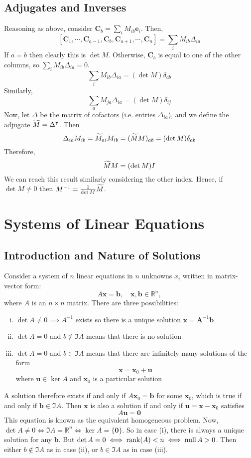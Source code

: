 \documentclass{article}
\begin{document}
\subsection{Adjugates and Inverses}
Reasoning as above, consider $\bm C_b = \sum_i M_{ib} \bm e_i$. Then,
\[ [\bm C_1, \cdots, \bm C_{a-1}, \bm C_b, \bm C_{a+1}, \cdots, \bm C_n ] = \sum_i M_{ib} \Delta_{ia} \]
If $a=b$ then clearly this is $\det M$. Otherwise, $\bm C_b$ is equal to one of the other columns, so $\sum_i M_{ib} \Delta_{ia} = 0$.
\[ \sum_i M_{ib} \Delta_{ia} = (\det M)\delta_{ab} \]
Similarly,
\[ \sum_a M_{ja} \Delta_{ia} = (\det M)\delta_{ij} \]
Now, let $\Delta$ be the matrix of cofactors (i.e. entries $\Delta_{ia}$), and we define the adjugate $\widetilde{M} = \Delta^\intercal$. Then
\[ \Delta_{ia}M_{ib} = \widetilde{M}_{ai}M_{ib} = (\widetilde{M} M)_{ab} = (\det M)\delta_{ab} \]
Therefore,
\[ \widetilde{M} M = (\det M) I \]
We can reach this result similarly considering the other index. Hence, if $\det M \neq 0$ then $M^{-1} = \frac{1}{\det M}\widetilde{M}$.

\section{Systems of Linear Equations}
\subsection{Introduction and Nature of Solutions}
Consider a system of $n$ linear equations in $n$ unknowns $x_i$ written in matrix-vector form:
\[ A\bm x = \bm b,\quad \bm x, \bm b \in \mathbb R^n, \]
where $A$ is an $n \times n$ matrix. There are three possibilities:
\begin{enumerate}[(i)]
	\item $\det A \neq 0 \implies A^{-1}$ exists so there is a unique solution $\bm x = \bm A^{-1} \bm b$
	\item $\det A = 0$ and $b \notin \Im A$ means that there is no solution
	\item $\det A = 0$ and $b \in \Im A$ means that there are infinitely many solutions of the form
	      \[ \bm x = \bm x_0 + \bm u \]
	      where $\bm u \in \ker A$ and $\bm x_0$ is a particular solution
\end{enumerate}
A solution therefore exists if and only if $A\bm x_0 = \bm b$ for some $\bm x_0$, which is true if and only if $\bm b \in \Im A$. Then $\bm x$ is also a solution if and only if $\bm u = \bm x - \bm x_0$ satisfies
\[ A\bm u = \bm 0 \]
This equation is known as the equivalent homogeneous problem. Now, $\det A \neq 0 \iff \Im A = \mathbb R^n \iff \ker A = \{ \bm 0 \}$. So in case (i), there is always a unique solution for any $\bm b$. But $\det A = 0 \iff \rank(A) < n \iff \operatorname{null} A > 0$. Then either $b \notin \Im A$ as in case (ii), or $b \in \Im A$ as in case (iii).
\end{document}
